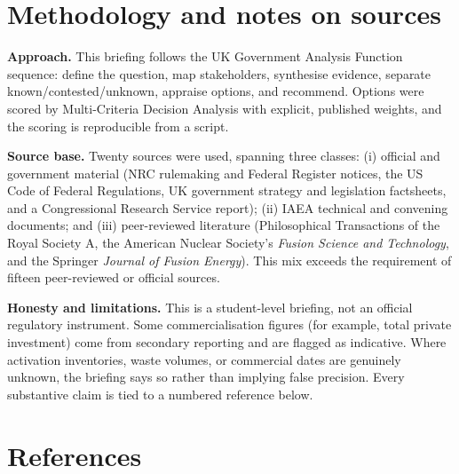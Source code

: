 \documentclass[11pt,a4paper]{article}
\begin{document}
\section{Methodology and notes on sources}

\textbf{Approach.} This briefing follows the UK Government Analysis Function
sequence: define the question, map stakeholders, synthesise evidence, separate
known/contested/unknown, appraise options, and recommend. Options were scored by
Multi-Criteria Decision Analysis with explicit, published weights, and the
scoring is reproducible from a script.

\textbf{Source base.} Twenty sources were used, spanning three classes: (i)
official and government material (NRC rulemaking and Federal Register notices, the
US Code of Federal Regulations, UK government strategy and legislation factsheets,
and a Congressional Research Service report); (ii) IAEA technical and convening
documents; and (iii) peer-reviewed literature (Philosophical Transactions of the
Royal Society A, the American Nuclear Society's \emph{Fusion Science and
Technology}, and the Springer \emph{Journal of Fusion Energy}). This mix exceeds
the requirement of fifteen peer-reviewed or official sources.

\textbf{Honesty and limitations.} This is a student-level briefing, not an
official regulatory instrument. Some commercialisation figures (for example,
total private investment) come from secondary reporting and are flagged as
indicative. Where activation inventories, waste volumes, or commercial dates are
genuinely unknown, the briefing says so rather than implying false precision.
Every substantive claim is tied to a numbered reference below.

\newpage
\section*{References}
\renewcommand{\refname}{}
\vspace{-2.5em}


\end{document}
